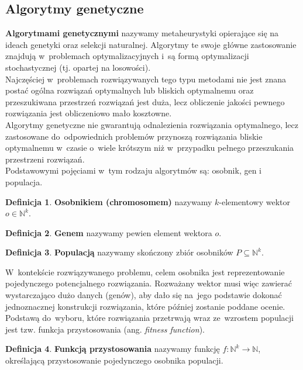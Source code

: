 \documentclass[12pt,a4paper]{article}
\theoremstyle{definition}
\newtheorem{defn}{Definicja}
\begin{document}
\subsection{Algorytmy genetyczne}
\label{subsec:genetic}
\textbf{Algorytmami genetycznymi} nazywamy metaheurystyki opierające się na ideach genetyki oraz selekcji naturalnej.
Algorytmy te swoje główne zastosowanie znajdują w~problemach optymalizacyjnych i~są formą optymalizacji stochastycznej (tj. opartej na losowości).\\

\noindent
Najczęściej w~problemach rozwiązywanych tego typu metodami nie jest znana postać ogólna rozwiązań optymalnych lub bliskich optymalnemu oraz przeszukiwana przestrzeń rozwiązań jest duża, lecz obliczenie jakości pewnego rozwiązania jest obliczeniowo mało kosztowne. \cite{luke2013}\\

\noindent
Algorytmy genetyczne nie gwarantują odnalezienia rozwiązania optymalnego, lecz zastosowane do~odpowiednich problemów przynoszą rozwiązania bliskie optymalnemu w~czasie o~wiele krótszym niż w~przypadku pełnego przeszukania przestrzeni rozwiązań.\\

\noindent
Podstawowymi pojęciami w~tym rodzaju algorytmów są: osobnik, gen i populacja.

\begin{defn}
\textbf{Osobnikiem (chromosomem)} nazywamy $k$-elementowy wektor $o \in \mathbb{N}^k$.
\end{defn}
\begin{defn}
\textbf{Genem} nazywamy pewien element wektora $o$.
\end{defn}
\begin{defn}
\textbf{Populacją} nazywamy skończony zbiór osobników $P \subseteq \mathbb{N}^k$.
\end{defn}

\noindent
W~kontekście rozwiązywanego problemu, celem osobnika jest reprezentowanie pojedynczego potencjalnego rozwiązania. Rozważany wektor musi więc zawierać wystarczająco dużo danych (genów), aby dało się na~jego podstawie dokonać jednoznacznej konstrukcji rozwiązania, które później zostanie poddane ocenie.\\

\noindent
Podstawą do~wyboru, które rozwiązania przetrwają wraz ze~wzrostem populacji jest tzw. funkcja przystosowania (ang. \emph{fitness function}).

\begin{defn}
\textbf{Funkcją przystosowania} nazywamy funkcję
$ f : \mathbb{N}^k \to \mathbb{N} $,
określającą przystosowanie pojedynczego osobnika populacji.
\end{defn}
\end{document}
